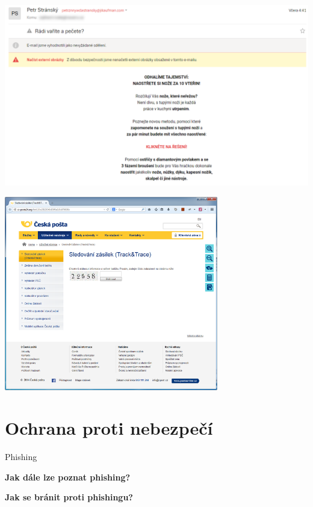 \documentclass[aspectratio=169]{beamer}
\begin{document}
\begin{frame}
    \includegraphics[width=\textwidth]{img/spam-1.png}
\end{frame}

\begin{frame}
    \begin{center}
        \includegraphics[width=0.7\textwidth]{img/posta.png}
    \end{center}
\end{frame}



\section{Ochrana proti nebezpečí}

\begin{frame}{Phishing}
    \begin{cardTiny}
        \begin{center}
            \textbf{Jak dále lze poznat phishing?}
        \end{center}
    \end{cardTiny}
    \begin{cardTiny}
        \begin{center}
            \textbf{Jak se bránit proti phishingu?}
        \end{center}
    \end{cardTiny}
\end{frame}
\end{document}
